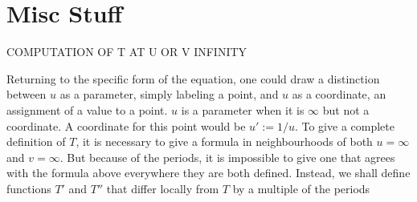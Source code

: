 \chapter{Misc Stuff}

COMPUTATION OF T AT U OR V INFINITY


Returning to the specific form of the equation, one could draw a distinction between $u$ as a parameter, simply labeling a point, and $u$ as a coordinate, an assignment of a value to a point. $u$ is a parameter when it is $\infty$ but not a coordinate. A coordinate for this point would be $u' := 1/u$. To give a complete definition of $T$, it is necessary to give a formula in neighbourhoods of both $u=\infty$ and $v=\infty$. But because of the periods, it is impossible to give one that agrees with the formula above everywhere they are both defined. Instead, we shall define functions $T'$ and $T''$ that differ locally from $T$ by a multiple of the periods

